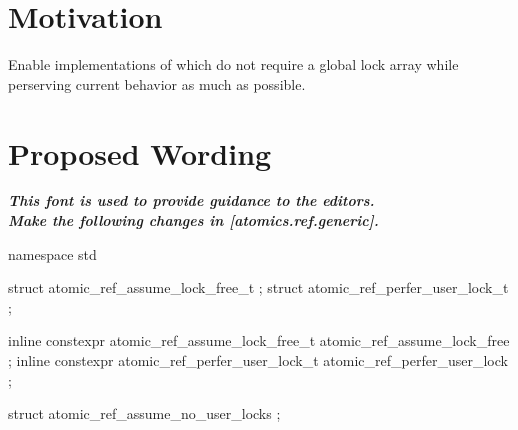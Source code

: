 \section*{Motivation}

Enable implementations of  which do not require a global lock array
while perserving current behavior as much as possible.

\section*{Proposed Wording}

\textbf{\textit{This font is used to provide guidance to the editors.}} \\

\textbf{\textit{Make the following changes in [atomics.ref.generic].}} \\

%
%

\begin{addedblock}
\begin{codeblock}
namespace std {
  struct atomic_ref_assume_lock_free_t    {};
  struct atomic_ref_perfer_user_lock_t    {};
  
  inline constexpr atomic_ref_assume_lock_free_t  atomic_ref_assume_lock_free {};
  inline constexpr atomic_ref_perfer_user_lock_t  atomic_ref_perfer_user_lock {};

  struct atomic_ref_assume_no_user_locks {};
}
\end{codeblock}
\end{addedblock}


